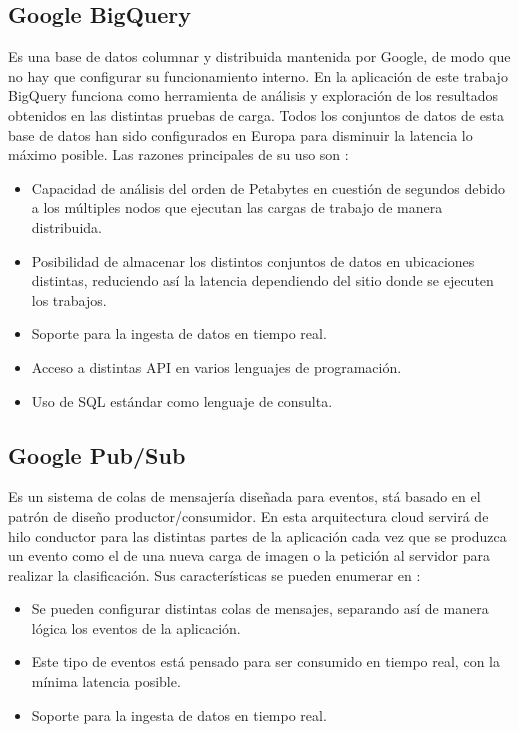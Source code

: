 \subsection{Google BigQuery}\label{subsec:bigquery}
Es una base de datos columnar y distribuida mantenida por Google, de modo que no hay que configurar su funcionamiento interno.
En la aplicación de este trabajo BigQuery funciona como herramienta de análisis y exploración de los resultados obtenidos en las distintas pruebas de carga.
Todos los conjuntos de datos de esta base de datos han sido configurados en Europa para disminuir la latencia lo máximo posible.
Las razones principales de su uso son :
\begin{itemize}
    \item Capacidad de análisis del orden de Petabytes en cuestión de segundos debido a los múltiples nodos que ejecutan las cargas de trabajo de manera distribuida.
    \item Posibilidad de almacenar los distintos conjuntos de datos en ubicaciones distintas, reduciendo así la latencia dependiendo del sitio donde se ejecuten los trabajos.
    \item Soporte para la ingesta de datos en tiempo real.
    \item Acceso a distintas API en varios lenguajes de programación.
    \item Uso de SQL estándar como lenguaje de consulta.
\end{itemize}

\subsection{Google Pub/Sub}\label{subsec:pubsub}
Es un sistema de colas de mensajería diseñada para eventos,
stá basado en el patrón de diseño productor/consumidor.
En esta arquitectura cloud servirá de hilo conductor para las distintas partes de la aplicación cada vez que se produzca un evento como el de una nueva carga de imagen o la petición al servidor para realizar la clasificación.
Sus características se pueden enumerar en :

\begin{itemize}
    \item Se pueden configurar distintas colas de mensajes, separando así de manera lógica los eventos de la aplicación.
    \item Este tipo de eventos está pensado para ser consumido en tiempo real, con la mínima latencia posible.
    \item Soporte para la ingesta de datos en tiempo real.
\end{itemize}

